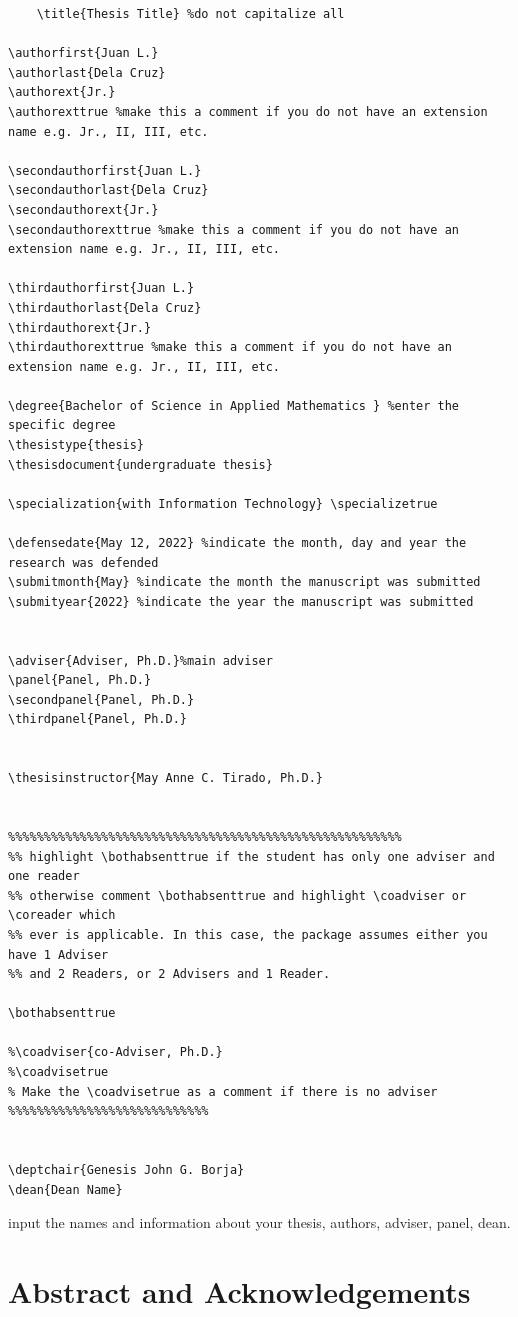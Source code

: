 \begin{verbatim}
	\title{Thesis Title} %do not capitalize all

\authorfirst{Juan L.}
\authorlast{Dela Cruz}
\authorext{Jr.} 
\authorexttrue %make this a comment if you do not have an extension name e.g. Jr., II, III, etc.

\secondauthorfirst{Juan L.}
\secondauthorlast{Dela Cruz}
\secondauthorext{Jr.} 
\secondauthorexttrue %make this a comment if you do not have an extension name e.g. Jr., II, III, etc.

\thirdauthorfirst{Juan L.}
\thirdauthorlast{Dela Cruz}
\thirdauthorext{Jr.} 
\thirdauthorexttrue %make this a comment if you do not have an extension name e.g. Jr., II, III, etc.

\degree{Bachelor of Science in Applied Mathematics } %enter the specific degree
\thesistype{thesis} 
\thesisdocument{undergraduate thesis} 

\specialization{with Information Technology} \specializetrue 

\defensedate{May 12, 2022} %indicate the month, day and year the research was defended
\submitmonth{May} %indicate the month the manuscript was submitted
\submityear{2022} %indicate the year the manuscript was submitted 


\adviser{Adviser, Ph.D.}%main adviser
\panel{Panel, Ph.D.} 
\secondpanel{Panel, Ph.D.} 
\thirdpanel{Panel, Ph.D.} 


\thesisinstructor{May Anne C. Tirado, Ph.D.} 


%%%%%%%%%%%%%%%%%%%%%%%%%%%%%%%%%%%%%%%%%%%%%%%%%%%%%%%
%% highlight \bothabsenttrue if the student has only one adviser and one reader
%% otherwise comment \bothabsenttrue and highlight \coadviser or \coreader which 
%% ever is applicable. In this case, the package assumes either you have 1 Adviser 
%% and 2 Readers, or 2 Advisers and 1 Reader. 

\bothabsenttrue

%\coadviser{co-Adviser, Ph.D.} 
%\coadvisetrue  
% Make the \coadvisetrue as a comment if there is no adviser
%%%%%%%%%%%%%%%%%%%%%%%%%%%%


\deptchair{Genesis John G. Borja} 
\dean{Dean Name}
\end{verbatim}

input the names and information about your thesis, authors, adviser, panel, dean.

\section{Abstract and Acknowledgements}

